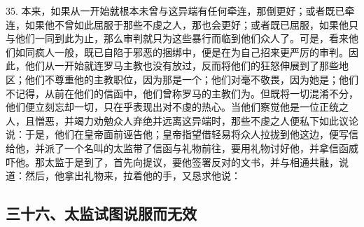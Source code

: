35. 本来，如果从一开始就根本未曾与这异端有任何牵连，那倒更好；或者既已牵连，如果他不曾如此屈服于那些不虔之人，那也会更好；或者既已屈服，如果他只与他们一同到此为止，那么审判就只为这些暴行而临到他们众人了。可是，看来他们如同疯人一般，既已自陷于邪恶的捆绑中，便是在为自己招来更严厉的审判。因此，他们从一开始就连罗马主教也没有放过，反而将他们的狂怒伸展到了那些地区；他们不尊重他的主教职位，因为那是一个；他们对毫不敬畏，因为她是；他们不记得，从前在他们的信函中，他们曾称罗马的主教们为。但既将一切混淆不分，他们便立刻忘却一切，只在乎表现出对不虔的热心。当他们察觉他是一位正统之人，且憎恶，并竭力劝勉众人弃绝并远离这异端时，那些不虔之人便私下如此议论说：于是，他们在皇帝面前诬告他；皇帝指望借轻易将众人拉拢到他这边，便写信给他，并派了一个名叫的太监带了信函与礼物前往，要用礼物讨好他，并拿信函威吓他。那太监于是到了，首先向提议，要他签署反对的文书，并与相通共融，说道：然后，他拿出礼物来，拉着他的手，又恳求他说：\par


\subsection{三十六、太监试图说服而无效}

